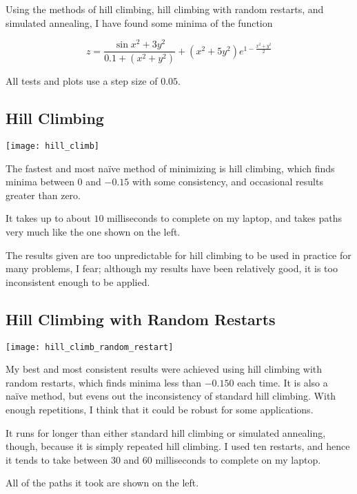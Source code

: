\documentclass{article}
\begin{document}
Using the methods of hill climbing, hill climbing with random restarts, and
simulated annealing, I have found some minima of the function

\[
    z = \frac{\sin{x^2 + 3y^2}}{0.1 + (x^2 + y^2)}
    + \left(x^2 + 5y^2\right) e^{1 - \frac{x^2 + y^2}{2}}
\]

All tests and plots use a step size of $0.05$.

\subsection*{Hill Climbing}
\begin{multicols*}{2}

\begin{center}
    \texttt{[image: hill\_climb]}
\end{center}

\columnbreak

The fastest and most na{\"i}ve method of minimizing is hill climbing, which
finds minima between $0$ and $-0.15$ with some consistency, and occasional
results greater than zero.

It takes up to about $10$ milliseconds to complete on my laptop, and takes paths very
much like the one shown on the left.

The results given are too unpredictable for hill climbing to be used in practice
for many problems, I fear; although my results have been relatively good, it
is too inconsistent enough to be applied.
\end{multicols*}

\subsection*{Hill Climbing with Random Restarts}
\begin{multicols*}{2}

\begin{center}
    \texttt{[image: hill\_climb\_random\_restart]}
\end{center}

\columnbreak

My best and most consistent results were achieved using hill climbing with
random restarts, which finds minima less than $-0.150$ each time. It is also a
na{\"i}ve method, but evens out the inconsistency of standard hill climbing.
With enough repetitions, I think that it could be robust for some applications.

It runs for longer than either standard hill climbing or simulated annealing,
though, because it is simply repeated hill climbing. I used ten restarts, and
hence it tends to take between $30$ and $60$ milliseconds to complete on my
laptop.

All of the paths it took are shown on the left.

\end{multicols*}
\end{document}
